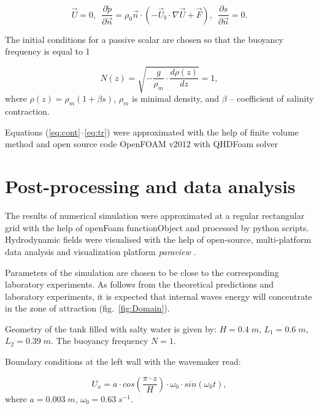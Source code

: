 \documentclass[a4wide,fontsize=12pt]{article}
\begin{document}
\begin{equation}\label{eq:qhd_walls}
        \vec{U} = 0, \,\,\, \frac{\partial \tilde p}{ \partial \vec{n}} = \rho_0 \vec n \cdot \left ( -\vec U_b \cdot \nabla \vec U + \vec F \right), \,\,\, \frac{\partial s}{ \partial \vec{n}} = 0.
\end{equation}

The initial conditions for a passive scalar are chosen so that the buoyancy frequency is equal to 1

\begin{equation}
    N(z) = \sqrt{- \frac{g}{\rho_m}\cdot\frac{d \rho(z)}{dz}} = 1,
\end{equation}
\noindent
where $\rho(z) = \rho_m(1+\beta s)$, $\rho_m$ is minimal density,  and $\beta$ -- coefficient of salinity contraction. 

Equations (\ref{eq:cont}--\ref{eq:tr}) were approximated with the help of finite volume method and open source code OpenFOAM v2012 with QHDFoam solver \cite{QGDFOam}

\section{Post-processing and data analysis}

The results of numerical simulation were approximated at a regular rectangular grid with the help of openFoam functionObject and processed by python scripts. Hydrodynamic fields were visualised with the help of open-source, multi-platform data analysis and visualization platform \emph{paraview} \cite{paraview}. 


Parameters of the simulation are chosen to be close to the corresponding laboratory experiments.
As follows from the theoretical predictions and laboratory experiments, it is expected that internal waves energy will concentrate in the zone of attraction (fig.~\ref{fig:Domain}). 

Geometry of the tank filled with salty water is given by: $H = 0.4 \; m$, $L_1=0.6 \; m$, $L_2 = 0.39 \; m$.
The buoyancy frequency $N=1$.

Boundary conditions at the left wall with the wavemaker read:

\begin{equation}
    U_x = a\cdot cos\left(\frac{\pi \cdot z}{H}\right)\cdot \omega_0 \cdot  sin(\omega_0 t),
    \label{eq:wmc}
\end{equation}
where $a = 0.003 \; m$, $\omega_0 = 0.63 \; s^{-1}$.
\end{document}
